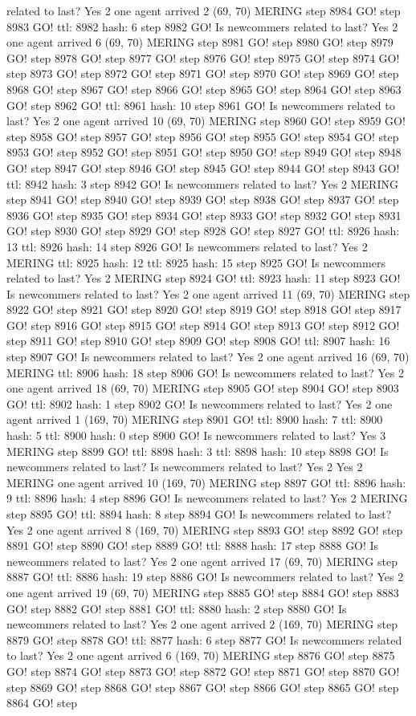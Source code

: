 related to last? Yes 2 one agent arrived 2 (69, 70) MERING step 8984 GO! step 8983 GO! ttl: 8982 hash: 6 step 8982 GO! Is newcommers related to last? Yes 2 one agent arrived 6 (69, 70) MERING step 8981 GO! step 8980 GO! step 8979 GO! step 8978 GO! step 8977 GO! step 8976 GO! step 8975 GO! step 8974 GO! step 8973 GO! step 8972 GO! step 8971 GO! step 8970 GO! step 8969 GO! step 8968 GO! step 8967 GO! step 8966 GO! step 8965 GO! step 8964 GO! step 8963 GO! step 8962 GO! ttl: 8961 hash: 10 step 8961 GO! Is newcommers related to last? Yes 2 one agent arrived 10 (69, 70) MERING step 8960 GO! step 8959 GO! step 8958 GO! step 8957 GO! step 8956 GO! step 8955 GO! step 8954 GO! step 8953 GO! step 8952 GO! step 8951 GO! step 8950 GO! step 8949 GO! step 8948 GO! step 8947 GO! step 8946 GO! step 8945 GO! step 8944 GO! step 8943 GO! ttl: 8942 hash: 3 step 8942 GO! Is newcommers related to last? Yes 2 MERING step 8941 GO! step 8940 GO! step 8939 GO! step 8938 GO! step 8937 GO! step 8936 GO! step 8935 GO! step 8934 GO! step 8933 GO! step 8932 GO! step 8931 GO! step 8930 GO! step 8929 GO! step 8928 GO! step 8927 GO! ttl: 8926 hash: 13 ttl: 8926 hash: 14 step 8926 GO! Is newcommers related to last? Yes 2 MERING ttl: 8925 hash: 12 ttl: 8925 hash: 15 step 8925 GO! Is newcommers related to last? Yes 2 MERING step 8924 GO! ttl: 8923 hash: 11 step 8923 GO! Is newcommers related to last? Yes 2 one agent arrived 11 (69, 70) MERING step 8922 GO! step 8921 GO! step 8920 GO! step 8919 GO! step 8918 GO! step 8917 GO! step 8916 GO! step 8915 GO! step 8914 GO! step 8913 GO! step 8912 GO! step 8911 GO! step 8910 GO! step 8909 GO! step 8908 GO! ttl: 8907 hash: 16 step 8907 GO! Is newcommers related to last? Yes 2 one agent arrived 16 (69, 70) MERING ttl: 8906 hash: 18 step 8906 GO! Is newcommers related to last? Yes 2 one agent arrived 18 (69, 70) MERING step 8905 GO! step 8904 GO! step 8903 GO! ttl: 8902 hash: 1 step 8902 GO! Is newcommers related to last? Yes 2 one agent arrived 1 (169, 70) MERING step 8901 GO! ttl: 8900 hash: 7 ttl: 8900 hash: 5 ttl: 8900 hash: 0 step 8900 GO! Is newcommers related to last? Yes 3 MERING step 8899 GO! ttl: 8898 hash: 3 ttl: 8898 hash: 10 step 8898 GO! Is newcommers related to last? Is newcommers related to last? Yes 2 Yes 2 MERING one agent arrived 10 (169, 70) MERING step 8897 GO! ttl: 8896 hash: 9 ttl: 8896 hash: 4 step 8896 GO! Is newcommers related to last? Yes 2 MERING step 8895 GO! ttl: 8894 hash: 8 step 8894 GO! Is newcommers related to last? Yes 2 one agent arrived 8 (169, 70) MERING step 8893 GO! step 8892 GO! step 8891 GO! step 8890 GO! step 8889 GO! ttl: 8888 hash: 17 step 8888 GO! Is newcommers related to last? Yes 2 one agent arrived 17 (69, 70) MERING step 8887 GO! ttl: 8886 hash: 19 step 8886 GO! Is newcommers related to last? Yes 2 one agent arrived 19 (69, 70) MERING step 8885 GO! step 8884 GO! step 8883 GO! step 8882 GO! step 8881 GO! ttl: 8880 hash: 2 step 8880 GO! Is newcommers related to last? Yes 2 one agent arrived 2 (169, 70) MERING step 8879 GO! step 8878 GO! ttl: 8877 hash: 6 step 8877 GO! Is newcommers related to last? Yes 2 one agent arrived 6 (169, 70) MERING step 8876 GO! step 8875 GO! step 8874 GO! step 8873 GO! step 8872 GO! step 8871 GO! step 8870 GO! step 8869 GO! step 8868 GO! step 8867 GO! step 8866 GO! step 8865 GO! step 8864 GO! step 